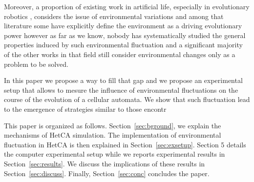 Moreover, a proportion of existing work in artificial life, especially in evolutionary robotics \citep{floreano2000evolutionary}, considers the issue of environmental variations and among that literature some have explicitly define the environment as a driving evolutionary power \citep{bredeche2012environmentdrivenopenende} however as far as we know, nobody has systematically studied the general properties induced by such environmental fluctuation and a significant majority of the other works in that field still consider environmental changes only as a problem to be solved.   %

In this paper we propose a way to fill that gap and we propose an experimental setup that allows to mesure the influence of environmental fluctuations on the course of the evolution of a cellular automata. We show that such fluctuation lead to the emergence of strategies similar to those encontr

This paper is organized as follows. Section~\ref{sec:bground}, we explain the mechanisms of HetCA simulation. The implementation of environmental fluctuation in HetCA is then explained in Section~\ref{sec:exsetup}. Section 5 details the computer experimental setup while we reports experimental results in Section~\ref{sec:results}. We discuss the implications of these results in Section~\ref{sec:discuss}. Finally, Section~\ref{sec:conc} concludes the paper.



